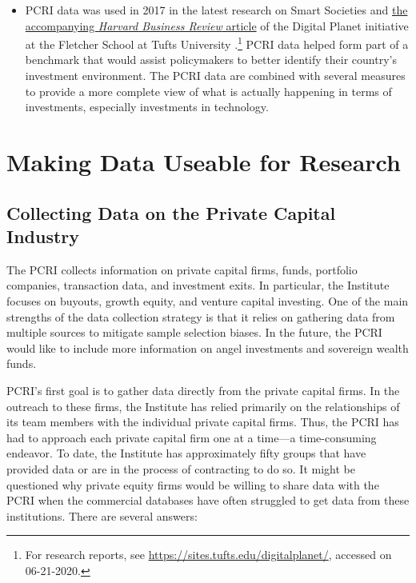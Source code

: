 \begin{itemize}
\item
  PCRI data was used in 2017 in the latest research on Smart Societies and \href{https://sites.tufts.edu/digitalplanet/hbr-the-smart-society-of-the-future-doesnt-look-like-science-fiction/}{the accompanying \emph{Harvard Business Review} article} of the Digital Planet initiative at the Fletcher School at Tufts University \citep{chakrovorti2017}.\footnote{For research reports, see \url{https://sites.tufts.edu/digitalplanet/}, accessed on 06-21-2020.} PCRI data helped form part of a benchmark that would assist policymakers to better identify their country's investment environment. The PCRI data are combined with several measures to provide a more complete view of what is actually happening in terms of investments, especially investments in technology.
\end{itemize}

\hypertarget{making-data-useable-for-research}{%
\section{Making Data Useable for Research}\label{making-data-useable-for-research}}

\hypertarget{collecting-data-on-the-private-capital-industry}{%
\subsection{Collecting Data on the Private Capital Industry}\label{collecting-data-on-the-private-capital-industry}}

The PCRI collects information on private capital firms, funds, portfolio companies, transaction data, and investment exits. In particular, the Institute focuses on buyouts, growth equity, and venture capital investing. One of the main strengths of the data collection strategy is that it relies on gathering data from multiple sources to mitigate sample selection biases. In the future, the PCRI would like to include more information on angel investments and sovereign wealth funds.

PCRI's first goal is to gather data directly from the private capital firms. In the outreach to these firms, the Institute has relied primarily on the relationships of its team members with the individual private capital firms. Thus, the PCRI has had to approach each private capital firm one at a time---a time-consuming endeavor. To date, the Institute has approximately fifty groups that have provided data or are in the process of contracting to do so. It might be questioned why private equity firms would be willing to share data with the PCRI when the commercial databases have often struggled to get data from these institutions. There are several answers:

